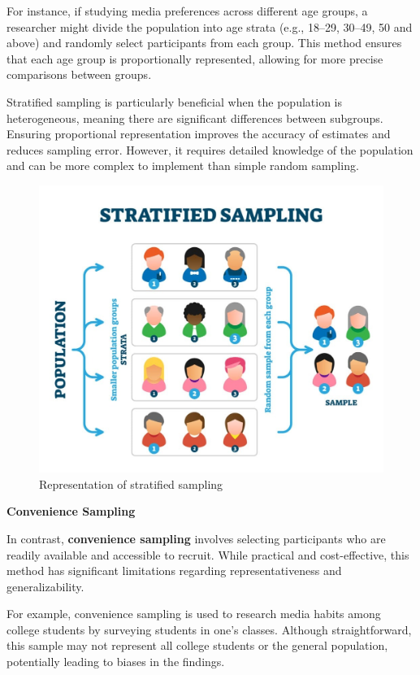 \documentclass[
]{book}
\begin{document}
For instance, if studying media preferences across different age groups, a researcher might divide the population into age strata (e.g., 18--29, 30--49, 50 and above) and randomly select participants from each group. This method ensures that each age group is proportionally represented, allowing for more precise comparisons between groups.

Stratified sampling is particularly beneficial when the population is heterogeneous, meaning there are significant differences between subgroups. Ensuring proportional representation improves the accuracy of estimates and reduces sampling error. However, it requires detailed knowledge of the population and can be more complex to implement than simple random sampling.

\begin{figure}
\centering
\includegraphics[width=1\textwidth,height=\textheight]{images/strata.jpg}
\caption{Representation of stratified sampling}
\end{figure}

\textbf{Convenience Sampling}

In contrast, \textbf{convenience sampling} involves selecting participants who are readily available and accessible to recruit. While practical and cost-effective, this method has significant limitations regarding representativeness and generalizability.

For example, convenience sampling is used to research media habits among college students by surveying students in one's classes. Although straightforward, this sample may not represent all college students or the general population, potentially leading to biases in the findings.
\end{document}
